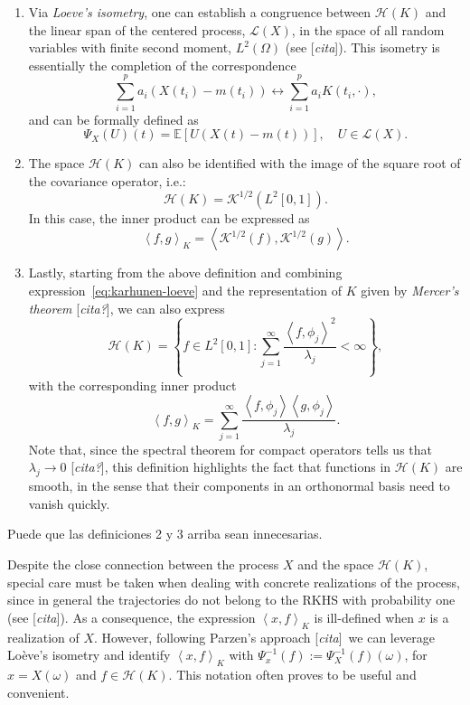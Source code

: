 \documentclass[ba]{imsart}
\numberwithin{equation}{section}
\theoremstyle{plain}
\newcommand{\E}{\mathbb{E}}
\newcommand\dotprod[2]{\left\langle #1, #2 \right\rangle}
\newenvironment{comment}
{
\noindent \em \color{red}
}
{
\color{black}
}
\newcommand\incomment[1]{\color{red}[\textit{#1}]\color{black}}
\begin{document}
\begin{enumerate}
  \item Via \textit{Loeve's isometry}, one can establish a congruence between \(\mathcal H(K)\) and the linear span of the centered process, \(\mathcal L(X)\), in the space of all random variables with finite second moment, \(L^2(\Omega)\) (see \incomment{cita}). This isometry is essentially the completion of the correspondence
  \[
  \sum_{i=1}^p a_i (X(t_i) - m(t_i)) \longleftrightarrow \sum_{i=1}^p a_i K(t_i, \cdot),
\]
and can be formally defined as
\begin{equation}\label{eq:loeves-isometry}
  \Psi_X(U)(t) = \E[U(X(t) - m(t))], \quad U \in \mathcal L(X).
\end{equation}
  \item The space \(\mathcal H(K)\) can also be identified with the image of the square root of the covariance operator, i.e.:
  \begin{equation}\label{eq:rkhs-square-root}
  \mathcal H(K) = \mathcal K^{1/2}(L^2[0, 1]).
\end{equation}
In this case, the inner product can be expressed as
\[
\dotprod{f}{g}_K = \dotprod{\mathcal K^{1/2}(f)}{\mathcal K^{1/2}(g)}.
\]

  \item Lastly, starting from the above definition and combining expression~\eqref{eq:karhunen-loeve} and the representation of \(K\) given by \textit{Mercer's theorem} \incomment{cita?}, we can also express
  \begin{equation}\label{rkhs-sum-lambda}
    \mathcal H(K) = \left\{f \in L^2[0, 1]: \sum_{j=1}^\infty \frac{\dotprod{f}{\phi_j}^2}{\lambda_j} < \infty \right\},
  \end{equation}
  with the corresponding inner product
  \[
  \dotprod{f}{g}_K = \sum_{j=1}^\infty \frac{\dotprod{f}
  {\phi_j}\dotprod{g}{\phi_j}}{\lambda_j}.
  \]
Note that, since the spectral theorem for compact operators tells us that \(\lambda_j \to 0\) \incomment{cita?}, this definition highlights the fact that functions in \(\mathcal H(K)\) are smooth, in the sense that their components in an orthonormal basis need to vanish quickly.
\end{enumerate}

\begin{comment}
  Puede que las definiciones 2 y 3 arriba sean innecesarias.
\end{comment}

Despite the close connection between the process \(X\) and the space \(\mathcal H(K)\), special care must be taken when dealing with concrete realizations of the process, since in general the trajectories do not belong to the RKHS with probability one (see \incomment{cita}). As a consequence, the expression \(\dotprod{x}{f}_K\) is ill-defined when \(x\) is a realization of \(X\). However, following Parzen's approach \incomment{cita}\ we can leverage Loève's isometry and identify \(\dotprod{x}{f}_K \) with \( \Psi_x^{-1}(f) := \Psi_X^{-1}(f)(\omega)\), for \(x=X(\omega)\) and \(f\in \mathcal H(K)\). This notation often proves to be useful and convenient.
\end{document}
